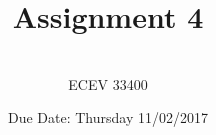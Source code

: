 \documentclass{article}
\begin{document}

\title{Assignment 4} %
\author{ \\ECEV 33400} %
\date{Due Date: Thursday 11/02/2017} %

\maketitle

%
%


\end{document}
